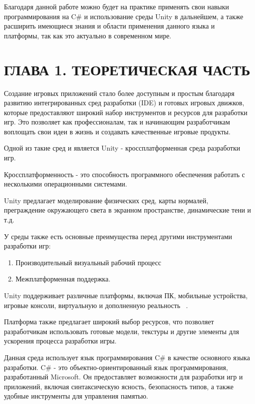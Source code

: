 \documentclass[14pt, oneside]{altsu-report}
\begin{document}
Благодаря данной работе можно будет на практике применять свои навыки программирования на C\# и использование среды Unity в дальнейшем, а также расширить имеющиеся знания и области применения данного языка и платформы, так как это актуально в современном мире.


\chapter{ГЛАВА 1. ТЕОРЕТИЧЕСКАЯ ЧАСТЬ} 

Создание игровых приложений стало более доступным и простым благодаря развитию интегрированных сред разработки (IDE) и готовых игровых движков, которые предоставляют широкий набор инструментов и ресурсов для разработки игр. Это позволяет как профессионалам, так и начинающим разработчикам воплощать свои идеи в жизнь и создавать качественные игровые продукты.

Одной из такие сред и является Unity - кроссплатформенная среда разработки игр. 

Кроссплатформенность - это способность программного обеспечения работать с несколькими операционными системами. 

Unity предлагает моделирование физических сред, карты нормалей, преграждение окружающего света в экранном пространстве, динамические тени и т.д. 

У среды также есть основные преимущества перед другими инструментами разработки игр:

\begin{enumerate}
\item Производительный визуальный рабочий процесс
\item Межплатформенная поддержка.
\end{enumerate} 

Unity поддерживает различные платформы, включая ПК, мобильные устройства, игровые консоли, виртуальную и дополненную реальность ~\cite{Unity, Unity2, Unity5}.

Платформа также предлагает широкий выбор ресурсов, что позволяет разработчикам использовать готовые модели, текстуры и другие элементы для ускорения процесса разработки игры. 

Данная среда использует язык программирования C\# в качестве основного языка разработки. C\# - это объектно-ориентированный язык программирования, разработанный Microsoft. Он предоставляет возможности для разработки игр и приложений, включая синтаксическую ясность, безопасность типов, а также удобные инструменты для управления памятью.
\end{document}
